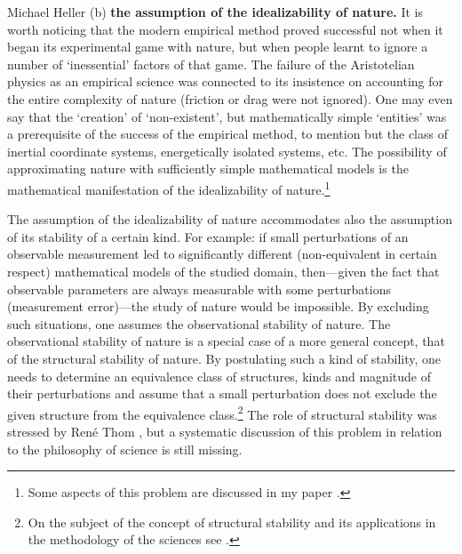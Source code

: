 \begin{artengenv}{Michael Heller}
(b) \textbf{the assumption of the idealizability of nature.} It is worth noticing that the modern empirical method
proved successful not when it began its experimental game with nature, but when people learnt to ignore a number of
`inessential' factors of that game. The failure of the Aristotelian physics as an empirical science was connected to
its insistence on accounting for the entire complexity of nature (friction or drag were not ignored). One may even say
that the `creation' of `non-existent', but mathematically simple `entities' was a prerequisite of the success of the
empirical method, to mention but the class of inertial coordinate systems, energetically isolated systems, etc. The
possibility of approximating nature with sufficiently simple mathematical models is the mathematical manifestation of
the idealizability of nature.\footnote{Some aspects of this problem are discussed in my paper
	\parencite{heller_o_1983}.
}

The assumption of  the idealizability of nature accommodates also the assumption of its stability of a certain kind.
For example: if small perturbations of an observable measurement led to significantly different (non-equivalent in
certain respect) mathematical models of the studied domain, then---given the fact that observable parameters are always
measurable with some perturbations (measurement error)---the study of nature would be impossible. By excluding such
situations, one assumes the observational stability of nature. The observational stability of nature is a special case
of a more general concept, that of the structural stability of nature. By postulating such a kind of stability, one
needs to determine an equivalence class of structures, kinds and magnitude of their perturbations and assume that a
small perturbation does not exclude the given structure from the equivalence class.\footnote{On the subject of the
concept of structural stability and its applications in the methodology of the sciences see
\parencite{szydlowski_filozoficzne_1983}.
} The role of structural stability was stressed by René Thom
\parencite*{thom_stabilite_1977},
but a systematic discussion of this problem in relation to the philosophy of science
is still missing.


\end{artengenv}
